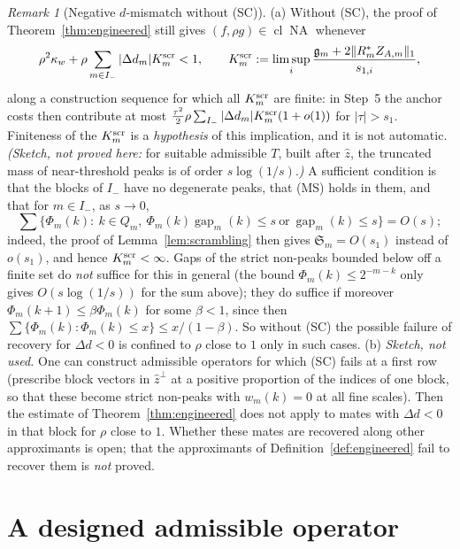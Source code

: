 \documentclass[10pt]{amsart}
\theoremstyle{definition}
\theoremstyle{remark}
\newtheorem{remark}[theorem]{Remark}
\newcommand{\NA}{\operatorname{NA}}
\newcommand{\cl}{\operatorname{cl}}
\newcommand{\gap}{\operatorname{gap}}
\newcommand{\zh}{\hat z}
\begin{document}
\begin{remark}[Negative $d$-mismatch without \textup{(SC)}]\label{rem:withoutSC}
(a) Without \textup{(SC)}, the proof of Theorem~\ref{thm:engineered} still
gives $(f,\rho g)\in\cl\NA$ whenever
\[
 \rho^2\kappa_w+\rho\sum_{m\in I_-}|\Delta d_m|K^{\rm scr}_m<1,\qquad
 K^{\rm scr}_m:=\limsup_i\frac{\mathfrak g_m+2\|R^*_mZ_{A,m}\|_1}{s_{1,i}},
\]
along a construction sequence for which all $K^{\rm scr}_m$ are finite: in
Step~5 the anchor costs then contribute at most
$\frac{\tau^2}2\rho\sum_{I_-}|\Delta d_m|K^{\rm scr}_m(1+o(1))$ for
$|\tau|>s_1$.  Finiteness of the $K^{\rm scr}_m$ is a \emph{hypothesis}
of this implication, and it is not automatic.  \emph{(Sketch, not proved
here:} for suitable admissible $T$, built after $\zh$, the truncated mass of
near-threshold peaks is of order $s\log(1/s)$.\emph{)}  A sufficient
condition is that the blocks of $I_-$ have no degenerate peaks, that
\textup{(MS)} holds in them, and that for $m\in I_-$, as $s\to0$,
\[
 \sum\big\{\Phi_m(k):\ k\in Q_m,\ \Phi_m(k)\gap_m(k)\le s\ \text{or}\
 \gap_m(k)\le s\big\}=O(s);
\]
indeed, the proof of Lemma~\ref{lem:scrambling} then gives
$\mathfrak S_m=O(s_1)$ instead of $o(s_1)$, and hence
$K^{\rm scr}_m<\infty$.  Gaps of the strict non-peaks bounded below off a
finite set do \emph{not} suffice for this in general (the bound
$\Phi_m(k)\le2^{-m-k}$ only gives $O(s\log(1/s))$ for the sum above); they
do suffice if moreover $\Phi_m(k+1)\le\beta\Phi_m(k)$ for some $\beta<1$,
since then $\sum\{\Phi_m(k):\Phi_m(k)\le x\}\le x/(1-\beta)$.  So without
\textup{(SC)} the possible failure of recovery for $\Delta d<0$ is confined
to $\rho$ close to $1$ only in such cases.
(b) \emph{Sketch, not used.}  One can construct admissible operators for
which \textup{(SC)} fails at a first row (prescribe block vectors in
$\zh^\perp$ at a positive proportion of the indices of one block, so that
these become strict non-peaks with $w_m(k)=0$ at all fine scales).  Then the
estimate of Theorem~\ref{thm:engineered} does not apply to mates with
$\Delta d<0$ in that block for $\rho$ close to $1$.  Whether these mates are
recovered along other approximants is open; that the approximants of
Definition~\ref{def:engineered} fail to recover them is \emph{not} proved.
\end{remark}

\section{A designed admissible operator}\label{sec:designed}
\end{document}
